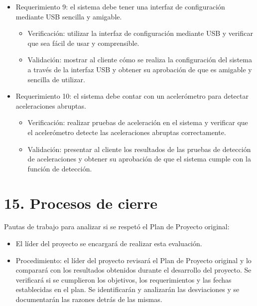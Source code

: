 \documentclass[
11pt, %
codirector, %
]{charter}
\begin{document}
\begin{itemize}
    \item Requerimiento 9: el sistema debe tener una interfaz de configuración mediante USB sencilla y amigable.
    \begin{itemize}    
    	\item Verificación: utilizar la interfaz de configuración mediante USB y verificar que sea fácil de usar y comprensible.
    	\item Validación: mostrar al cliente cómo se realiza la configuración del sistema a través de la interfaz USB y obtener su aprobación de que es amigable y sencilla de utilizar.
    \end{itemize}

    \item Requerimiento 10: el sistema debe contar con un acelerómetro para detectar aceleraciones abruptas.
    \begin{itemize}    
    	\item Verificación: realizar pruebas de aceleración en el sistema y verificar que el acelerómetro detecte las aceleraciones abruptas correctamente.
    	\item Validación: presentar al cliente los resultados de las pruebas de detección de aceleraciones y obtener su aprobación de que el sistema cumple con la función de detección.
    \end{itemize}

    
\end{itemize}

\pagebreak

\section{15. Procesos de cierre}    
\label{sec:cierre}

Pautas de trabajo para analizar si se respetó el Plan de Proyecto original:

    \begin{itemize}    
    \item El líder del proyecto se encargará de realizar esta evaluación.
    
    \item Procedimiento: el líder del proyecto revisará el Plan de Proyecto original y lo comparará con los resultados obtenidos durante el desarrollo del proyecto. Se verificará si se cumplieron los objetivos, los requerimientos y las fechas establecidas en el plan. Se identificarán y analizarán las desviaciones y se documentarán las razones detrás de las mismas.
    \end{itemize}
\end{document}
